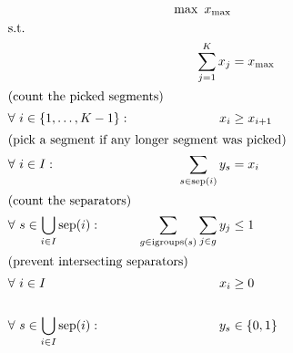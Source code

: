 \documentclass{minimal}
\newcommand{\igroups}{\text{igroups}}
\newcommand{\sep}{\text{sep}}
\begin{document}
	\begin{alignat*}{2}
		&& \max~ x_{\max} \\
		&\text{s.t.} \\
		&& \sum\limits_{j=1}^K x_j &= x_{\max} \\
		\intertext{\centering (count the picked segments)}
		&\forall~i\in\{1,\ldots,K-1\}:
			& x_i &\geq x_{i+1} \\
		\intertext{\centering (pick a segment if any longer segment was picked)}
		&\forall~i\in I :
			& \sum\limits_{s\in\sep(i)} y_s &= x_i \\
		\intertext{\centering (count the separators)}
		&\forall~s\in\bigcup\limits_{i\in I} \sep(i):
			& \sum\limits_{g\in\igroups(s)}\sum\limits_{j\in g} y_j &\leq 1 \\
		\intertext{\centering (prevent intersecting separators)}
		&\forall~i\in I
			& x_i &\geq 0 \\\\
		&\forall~s\in\bigcup\limits_{i\in I} \sep(i):
			& y_s &\in \{0,1\} \\\\
	\end{alignat*}
\end{document}

